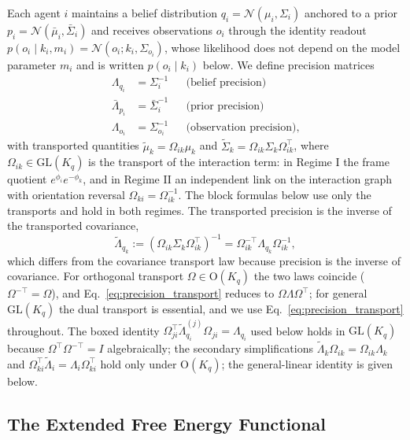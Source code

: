 Each agent $i$ maintains a belief distribution $q_i = \mathcal{N}(\mu_i, \Sigma_i)$ anchored to a prior $p_i = \mathcal{N}(\bar{\mu}_i, \bar{\Sigma}_i)$ and receives observations $o_i$ through the identity readout $p(o_i \mid k_i, m_i) = \mathcal{N}(o_i; k_i, \Sigma_{o_i})$, whose likelihood does not depend on the model parameter $m_i$ and is written $p(o_i \mid k_i)$ below. We define precision matrices
\begin{align}
\Lambda_{q_i} &= \Sigma_i^{-1} & &\text{(belief precision)} \\
\bar{\Lambda}_{p_i} &= \bar{\Sigma}_i^{-1} & &\text{(prior precision)} \\
\Lambda_{o_i} &= \Sigma_{o_i}^{-1} & &\text{(observation precision)},
\end{align}
with transported quantities $\tilde{\mu}_k = \Omega_{ik}\mu_k$ and $\tilde{\Sigma}_k = \Omega_{ik}\Sigma_k\Omega_{ik}^\top$, where $\Omega_{ik} \in \mathrm{GL}(K_q)$ is the transport of the interaction term: in Regime I the frame quotient $e^{\phi_i}e^{-\phi_k}$, and in Regime II an independent link on the interaction graph with orientation reversal $\Omega_{ki} = \Omega_{ik}^{-1}$. The block formulas below use only the transports and hold in both regimes. The transported precision is the inverse of the transported covariance,
\begin{equation}
\tilde{\Lambda}_{q_k} := (\Omega_{ik}\Sigma_k\Omega_{ik}^\top)^{-1} = \Omega_{ik}^{-\top}\Lambda_{q_k}\Omega_{ik}^{-1},
\label{eq:precision_transport}
\end{equation}
which differs from the covariance transport law because precision is the inverse of covariance. For orthogonal transport $\Omega \in \mathrm{O}(K_q)$ the two laws coincide ($\Omega^{-\top} = \Omega$), and Eq.~\eqref{eq:precision_transport} reduces to $\Omega\Lambda\Omega^\top$; for general $\mathrm{GL}(K_q)$ the dual transport is essential, and we use Eq.~\eqref{eq:precision_transport} throughout. The boxed identity $\Omega_{ji}^\top \tilde{\Lambda}_{q_i}^{(j)} \Omega_{ji} = \Lambda_{q_i}$ used below holds in $\mathrm{GL}(K_q)$ because $\Omega^\top \Omega^{-\top} = I$ algebraically; the secondary simplifications $\tilde{\Lambda}_k\Omega_{ik} = \Omega_{ik}\Lambda_k$ and $\Omega_{ki}^\top\tilde\Lambda_i = \Lambda_i\Omega_{ki}^\top$ hold only under $\mathrm{O}(K_q)$; the general-linear identity is given below.

\subsection{The Extended Free Energy Functional}

